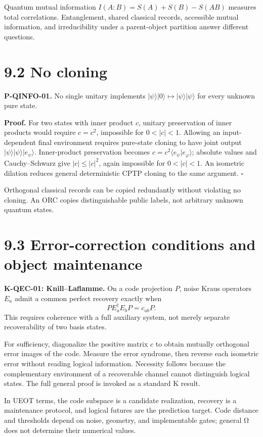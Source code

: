 \documentclass[
  11pt,
  oneside]{book}
\begin{document}
Quantum mutual information \(I(A:B)=S(A)+S(B)-S(AB)\) measures total
correlations. Entanglement, shared classical records, accessible mutual
information, and irreducibility under a parent-object partition answer
different questions.

\section{9.2 No cloning}

\label{p-qinfo-01}{}

\textbf{P-QINFO-01.} No single unitary implements
\(|\psi\rangle|0\rangle\mapsto|\psi\rangle|\psi\rangle\) for every
unknown pure state.

\textbf{Proof.} For two states with inner product \(c\), unitary
preservation of inner products would require \(c=c^2\), impossible for
\(0<|c|<1\). Allowing an input-dependent final environment requires
pure-state cloning to have joint output
\(|\psi\rangle|\psi\rangle|e_\psi\rangle\). Inner-product preservation
becomes \(c=c^2\langle e_\psi|e_\varphi\rangle\); absolute values and
Cauchy--Schwarz give \(|c|\le|c|^2\), again impossible for \(0<|c|<1\).
An isometric dilation reduces general deterministic CPTP cloning to the
same argument. \(\square\)

Orthogonal classical records can be copied redundantly without violating
no cloning. An ORC copies distinguishable public labels, not arbitrary
unknown quantum states.

\section{9.3 Error-correction conditions and object maintenance}

\textbf{K-QEC-01: Knill--Laflamme.} On a code projection \(P\), noise
Kraus operators \(E_a\) admit a common perfect recovery exactly when \[
PE_a^\dagger E_bP=c_{ab}P.
\] This requires coherence with a full auxiliary system, not merely
separate recoverability of two basis states.

For sufficiency, diagonalize the positive matrix \(c\) to obtain
mutually orthogonal error images of the code. Measure the error
syndrome, then reverse each isometric error without reading logical
information. Necessity follows because the complementary environment of
a recoverable channel cannot distinguish logical states. The full
general proof is invoked as a standard K result.

In UEOT terms, the code subspace is a candidate realization, recovery is
a maintenance protocol, and logical futures are the prediction target.
Code distance and thresholds depend on noise, geometry, and
implementable gates; general Ω does not determine their numerical
values.
\end{document}
